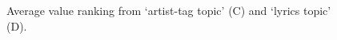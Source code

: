 \documentclass{article}
\begin{document}

\begin{figure}
 \centerline{}
 \caption{Average value ranking from `artist-tag topic' (C) and `lyrics topic' (D).}
 \label{fig:avg_rank_trend_34}
\end{figure}
\end{document}
